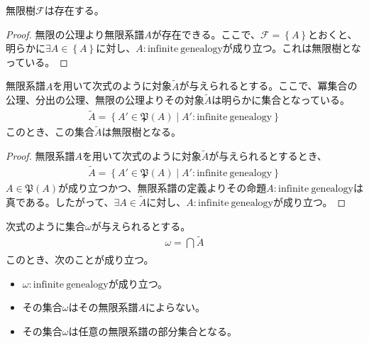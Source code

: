 \documentclass[dvipdfmx]{jsarticle}
\begin{document}
\begin{thm}\label{1.2.4.2}
無限樹$\mathcal{F}$は存在する。
\end{thm}
\begin{proof}
無限の公理より無限系譜$A$が存在できる。ここで、$\mathcal{F} =\left\{ A \right\}$とおくと、明らかに$\exists A \in \left\{ A \right\}$に対し、$A:\mathrm{infinite\ genealogy}$が成り立つ。これは無限樹となっている。
\end{proof}
\begin{thm}\label{1.2.4.3}
無限系譜$A$を用いて次式のように対象$\widetilde{A}$が与えられるとする。ここで、冪集合の公理、分出の公理、無限の公理よりその対象$\widetilde{A}$は明らかに集合となっている。
\begin{align*}
\widetilde{A} = \left\{ A'\in \mathfrak{P}(A) \middle| A':\mathrm{infinite\ genealogy} \right\}
\end{align*}
このとき、この集合$\widetilde{A}$は無限樹となる。
\end{thm}
\begin{proof}
無限系譜$A$を用いて次式のように対象$\widetilde{A}$が与えられるとするとき、
\begin{align*}
\widetilde{A} = \left\{ A'\in \mathfrak{P}(A) \middle| A':\mathrm{infinite\ genealogy} \right\}
\end{align*}
$A \in \mathfrak{P}(A)$が成り立つかつ、無限系譜の定義よりその命題$A:\mathrm{infinite\ genealogy}$は真である。したがって、$\exists A \in \widetilde{A}$に対し、$A:\mathrm{infinite\ genealogy}$が成り立つ。
\end{proof}
\begin{thm}\label{1.2.4.4}
次式のように集合$\omega$が与えられるとする。
\begin{align*}
\omega = \bigcap_{} \widetilde{A}
\end{align*}
このとき、次のことが成り立つ。
\begin{itemize}
\item
  $\omega:\mathrm{infinite\ genealogy}$が成り立つ。
\item
  その集合$\omega$はその無限系譜$A$によらない。
\item
  その集合$\omega$は任意の無限系譜の部分集合となる。
\end{itemize}
\end{thm}
\end{document}
